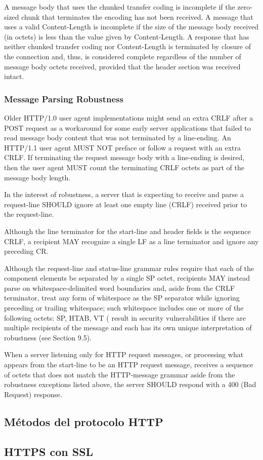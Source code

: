    A message body that uses the chunked transfer coding is incomplete if
   the zero-sized chunk that terminates the encoding has not been
   received.  A message that uses a valid Content-Length is incomplete
   if the size of the message body received (in octets) is less than the
   value given by Content-Length.  A response that has neither chunked
   transfer coding nor Content-Length is terminated by closure of the
   connection and, thus, is considered complete regardless of the number
   of message body octets received, provided that the header section was
   received intact.
\subsubsection{Message Parsing Robustness}
Older HTTP/1.0 user agent implementations might send an extra CRLF
after a POST request as a workaround for some early server
applications that failed to read message body content that was not
terminated by a line-ending.  An HTTP/1.1 user agent MUST NOT preface
or follow a request with an extra CRLF.  If terminating the request
message body with a line-ending is desired, then the user agent MUST
count the terminating CRLF octets as part of the message body length.

In the interest of robustness, a server that is expecting to receive
and parse a request-line SHOULD ignore at least one empty line (CRLF)
received prior to the request-line.

Although the line terminator for the start-line and header fields is
the sequence CRLF, a recipient MAY recognize a single LF as a line
terminator and ignore any preceding CR.

Although the request-line and status-line grammar rules require that
each of the component elements be separated by a single SP octet,
recipients MAY instead parse on whitespace-delimited word boundaries
and, aside from the CRLF terminator, treat any form of whitespace as
the SP separator while ignoring preceding or trailing whitespace;
such whitespace includes one or more of the following octets: SP,
HTAB, VT (%
result in security vulnerabilities if there are multiple recipients
of the message and each has its own unique interpretation of
robustness (see Section 9.5).

When a server listening only for HTTP request messages, or processing
what appears from the start-line to be an HTTP request message,
receives a sequence of octets that does not match the HTTP-message
grammar aside from the robustness exceptions listed above, the server
SHOULD respond with a 400 (Bad Request) response.
\subsection{Métodos del protocolo HTTP}
\subsection{HTTPS con SSL} 